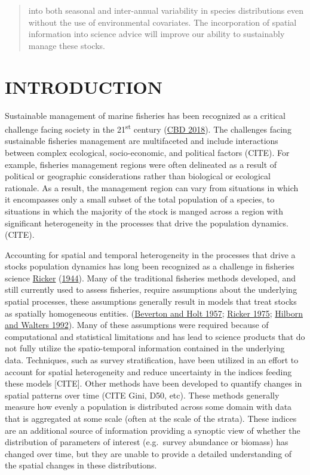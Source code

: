 \documentclass[
]{article}
\begin{document}
\begin{abstract}
into both seasonal and inter-annual variability in species distributions even without the use of environmental covariates. The incorporation of spatial information into science advice will improve our ability to sustainably manage these stocks.
\end{abstract}

\hypertarget{ref-intro}{%
\section{INTRODUCTION}\label{ref-intro}}

Sustainable management of marine fisheries has been recognized as a critical challenge facing society in the 21\textsuperscript{st} century (\protect\hyperlink{ref-cbdAichiBiodiversityTargets2018}{CBD 2018}). The challenges facing sustainable fisheries management are multifaceted and include interactions between complex ecological, socio-economic, and political factors (CITE). For example, fisheries management regions were often delineated as a result of political or geographic considerations rather than biological or ecological rationale. As a result, the management region can vary from situations in which it encompasses only a small subset of the total population of a species, to situations in which the majority of the stock is manged across a region with significant heterogeneity in the processes that drive the population dynamics. (CITE).

Accounting for spatial and temporal heterogeneity in the processes that drive a stocks population dynamics has long been recognized as a challenge in fisheries science \protect\hyperlink{ref-rickerFurtherNotesFishing1944}{Ricker} (\protect\hyperlink{ref-rickerFurtherNotesFishing1944}{1944}). Many of the traditional fisheries methods developed, and still currently used to assess fisheries, require assumptions about the underlying spatial processes, these assumptions generally result in models that treat stocks as spatially homogeneous entities. (\protect\hyperlink{ref-bevertonDynamicsExploitedFish1957}{Beverton and Holt 1957}; \protect\hyperlink{ref-rickerComputationInterpretationBiological1975}{Ricker 1975}; \protect\hyperlink{ref-hilbornQuantitativeFisheriesStock1992}{Hilborn and Walters 1992}). Many of these assumptions were required because of computational and statistical limitations and has lead to science products that do not fully utilize the spatio-temporal information contained in the underlying data. Techniques, such as survey stratification, have been utilized in an effort to account for spatial heterogeneity and reduce uncertainty in the indices feeding these models {[}CITE{]}. Other methods have been developed to quantify changes in spatial patterns over time (CITE Gini, D50, etc). These methods generally measure how evenly a population is distributed across some domain with data that is aggregated at some scale (often at the scale of the strata). These indices are an additional source of information providing a synoptic view of whether the distribution of parameters of interest (e.g.~survey abundance or biomass) has changed over time, but they are unable to provide a detailed understanding of the spatial changes in these distributions.
\end{document}
